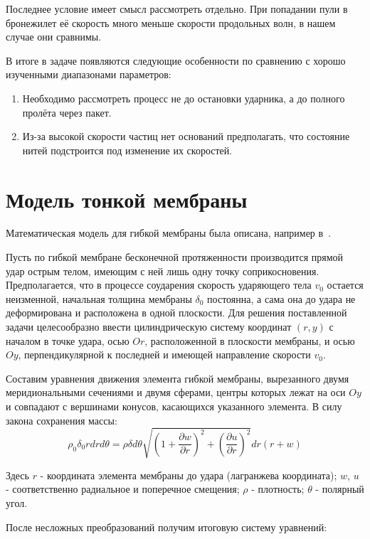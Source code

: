 Последнее условие имеет смысл рассмотреть отдельно.
При попадании пули в бронежилет её скорость много меньше скорости продольных волн, в нашем случае они сравнимы.

В итоге в задаче появляются следующие особенности по сравнению с хорошо изученными диапазонами параметров:
\begin{enumerate}
    \item Необходимо рассмотреть процесс не до остановки ударника, а до полного пролёта через пакет.
    \item Из-за высокой скорости частиц нет оснований предполагать, что состояние нитей подстроится под изменение их скоростей.
\end{enumerate}

\section{Модель тонкой мембраны}\label{sec:eq-membrane}
Математическая модель для гибкой мембраны была описана, например в~\cite{rakhmatulin}.

Пусть по гибкой мембране бесконечной протяженности производится прямой удар острым телом, имеющим с ней лишь одну
точку соприкосновения.
Предполагается, что в процессе соударения скорость ударяющего тела $v_0$ остается неизменной, начальная толщина
мембраны $\delta_0$ постоянна, а сама она до удара не деформирована и расположена в одной плоскости.
Для решения поставленной задачи целесообразно ввести цилиндрическую систему координат $(r,y)$ с началом в точке удара,
осью $Or$, расположенной в плоскости мембраны, и осью $Oy$, перпендикулярной к последней и имеющей направление скорости
$v_0$.

Составим уравнения движения элемента гибкой мембраны, вырезанного двумя меридиональными сечениями и двумя сферами,
центры которых лежат на оси $Oy$ и совпадают с вершинами конусов, касающихся указанного элемента.
В силу закона сохранения массы:
\begin{equation}
    \rho_0 \delta_0 r dr d\theta = \rho \delta d\theta \sqrt{\left( 1 + \dfrac{\partial w}{\partial r} \right) ^ 2 + \left( \dfrac{\partial u}{\partial r} \right) ^ 2} dr (r + w)
\end{equation}

Здесь $r$ - координата элемента мембраны до удара (лагранжева координата); $w$, $u$ - соответственно радиальное и
поперечное смещения; $\rho$ - плотность; $\theta$ - полярный угол.

После несложных преобразований получим итоговую систему уравнений:

